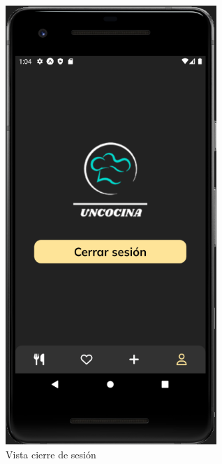 \begin{figure}[!h]
  \centering
  \includegraphics[width=8cm, scale=1]{Images/Imagenes/cierre.png}
  \caption{Vista cierre de sesión}
  \label{fig:cierre}
\end{figure}